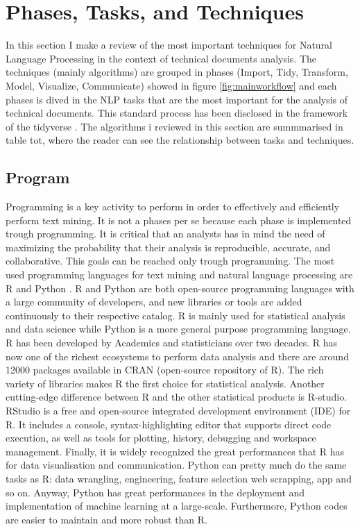 \documentclass[]{book}
\begin{document}
\chapter{Phases, Tasks, and Techniques}\label{sotatools}

In this section I make a review of the most important techniques for
Natural Language Processing in the context of technical documents
analysis. The techniques (mainly algorithms) are grouped in phases
(Import, Tidy, Transform, Model, Visualize, Communicate) showed in
figure \ref{fig:mainworkflow} and each phases is dived in the NLP tasks
that are the most important for the analysis of technical documents.
This standard process has been disclosed in the framework of the
tidyverse \citep{wickham2016r}. The algorithms i reviewed in this
section are summmarised in table tot, where the reader can see the
relationship between tasks and techniques.

\section{Program}\label{sotatoolsprogram}

Programming is a key activity to perform in order to effectively and
efficiently perform text mining. It is not a phases per se because each
phase is implemented trough programming. It is critical that an analysts
has in mind the need of maximizing the probability that their analysis
is reproducible, accurate, and collaborative. This goals can be reached
only trough programming. The most used programming languages for text
mining and natural language processing are R \citep{r2008} and Python
\citep{py95}. R and Python are both open-source programming languages
with a large community of developers, and new libraries or tools are
added continuously to their respective catalog. R is mainly used for
statistical analysis and data science while Python is a more general
purpose programming language. R has been developed by Academics and
statisticians over two decades. R has now one of the richest ecosystems
to perform data analysis and there are around 12000 packages available
in CRAN (open-source repository of R). The rich variety of libraries
makes R the first choice for statistical analysis. Another cutting-edge
difference between R and the other statistical products is R-studio.
RStudio is a free and open-source integrated development environment
(IDE) for R. It includes a console, syntax-highlighting editor that
supports direct code execution, as well as tools for plotting, history,
debugging and workspace management. Finally, it is widely recognized the
great performances that R has for data visualisation and communication.
Python can pretty much do the same tasks as R: data wrangling,
engineering, feature selection web scrapping, app and so on. Anyway,
Python has great performances in the deployment and implementation of
machine learning at a large-scale. Furthermore, Python codes are easier
to maintain and more robust than R.
\end{document}

